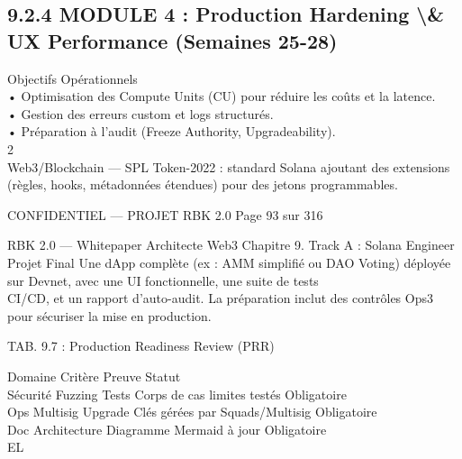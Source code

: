 \documentclass[12pt,landscape,a4paper]{article}
\newenvironment{confidential}
{\begin{tcolorbox}[
    colback=rbkred!5!white,
    colframe=rbkred!75!black,
    title=CONFIDENTIEL,
    fonttitle=\bfseries\color{white},
    coltitle=rbkred!75!black,
    breakable,
    enhanced,
    frame hidden,
    borderline west={2pt}{0pt}{rbkred!75!black}
]}
{\end{tcolorbox}}
\begin{document}
\subsection{9.2.4 MODULE 4 : Production Hardening \textbackslash{}& UX Performance (Semaines 25-28)}
Objectifs Opérationnels\\
\vspace{0.5em}
• Optimisation des Compute Units (CU) pour réduire les coûts et la latence.\\
\vspace{0.5em}
• Gestion des erreurs custom et logs structurés.\\
\vspace{0.5em}
• Préparation à l’audit (Freeze Authority, Upgradeability).\\
2\\
Web3/Blockchain — SPL Token-2022 : standard Solana ajoutant des extensions (règles, hooks, métadonnées étendues) pour des jetons programmables.\\
\vspace{0.5em}
\vspace{0.5em}
\vspace{0.5em}
\vspace{0.5em}
\begin{confidential}CONFIDENTIEL — PROJET RBK 2.0                                          Page 93 sur 316\end{confidential}
RBK 2.0 — Whitepaper Architecte Web3                                                                                          Chapitre 9. Track A : Solana Engineer\\
\vspace{0.5em}
\vspace{0.5em}
Projet Final Une dApp complète (ex : AMM simplifié ou DAO Voting) déployée sur Devnet, avec une UI fonctionnelle, une suite de tests\\
CI/CD, et un rapport d’auto-audit. La préparation inclut des contrôles Ops3 pour sécuriser la mise en production.\\
\vspace{0.5em}
\begin{center}\begin{tabular}TAB. 9.7 : Production Readiness Review (PRR)\end{tabular}\end{center}
\vspace{0.5em}
\vspace{0.5em}
Domaine Critère           Preuve                          Statut\\
Sécurité Fuzzing Tests    Corps de cas limites testés     Obligatoire\\
Ops      Multisig Upgrade Clés gérées par Squads/Multisig Obligatoire\\
Doc      Architecture     Diagramme Mermaid à jour        Obligatoire\\
\vspace{0.5em}
\vspace{0.5em}
\vspace{0.5em}
\vspace{0.5em}
EL\\
\end{document}
